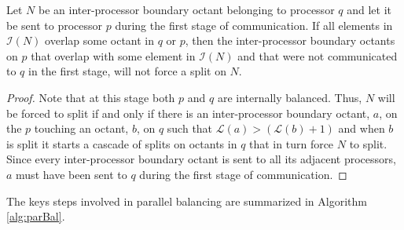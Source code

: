 \begin{lemma}
Let $N$ be an inter-processor boundary octant belonging to processor
$q$ and let it be sent to processor $p$ during the first stage of
communication. If all elements in $\mathcal{I}(N)$ overlap some octant
in $q$ or $p$, then the inter-processor boundary octants on $p$ that
overlap with some element in $\mathcal{I}(N)$ and that were not
communicated to $q$ in the first stage, will not force a split on $N$.
\label{lemma:pairwiseEscape}
\end{lemma}

\begin{proof}
Note that at this stage both $p$ and $q$ are internally
balanced. Thus, $N$ will be forced to split if and only if there is an
inter-processor boundary octant, $a$, on the $p$ touching an octant,
$b$, on $q$ such that $\mathcal{L}(a) > (\mathcal{L}(b) + 1)$ and when
$b$ is split it starts a cascade of splits on octants in $q$ that in
turn force $N$ to split. Since every inter-processor boundary octant
is sent to all its adjacent processors, $a$ must have been sent to $q$
during the first stage of communication.
\end{proof}

The keys steps involved in parallel balancing are summarized in
Algorithm \ref{alg:parBal}.

